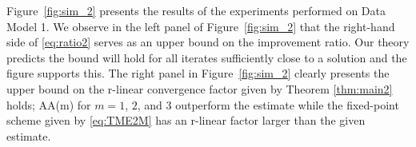 \documentclass[11pt]{article}
\begin{document}
Figure~\ref{fig:sim_2} presents the results of the experiments performed on Data Model 1.
We observe in the left panel of Figure~\ref{fig:sim_2} that the right-hand side of \eqref{eq:ratio2} serves as an upper bound on the improvement ratio. 
Our theory predicts the bound will hold for all iterates sufficiently close to a solution and the figure supports this. 
The right panel in Figure~\ref{fig:sim_2} clearly presents the upper bound on the r-linear convergence factor given by Theorem \ref{thm:main2} holds; AA(m) for $m=1$, $2$, and $3$ outperform the estimate while the fixed-point scheme given by \eqref{eq:TME2M} has an r-linear factor larger than the given estimate. 

%
%
%
\end{document}
